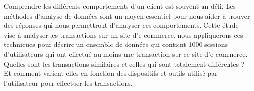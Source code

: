 Comprendre les différents comportements d'un client est souvent un défi. Les méthodes d'analyse  de données sont un moyen essentiel pour nous aider à trouver des réponses qui nous permettront  d'analyser ces comportements. 
Cette étude vise à analyser les transactions sur un site d'e-commerce, nous appliquerons ces  techniques pour décrire un ensemble de données qui contient 1000 sessions d'utilisateurs qui ont  effectué au moins une transaction sur ce site d'e-commerce.  
Quelles sont les transactions similaires et celles qui sont totalement différentes ? Et comment varient-elles en fonction des dispositifs et outils utilisé par l'utilisateur pour effectuer les  transactions.
